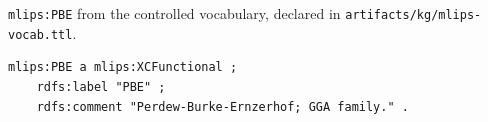 \texttt{mlips:PBE} from the controlled vocabulary, declared in
\texttt{artifacts/kg/mlips-vocab.ttl}.
\begin{lstlisting}[language=turtle]
mlips:PBE a mlips:XCFunctional ;
    rdfs:label "PBE" ;
    rdfs:comment "Perdew-Burke-Ernzerhof; GGA family." .
\end{lstlisting}
